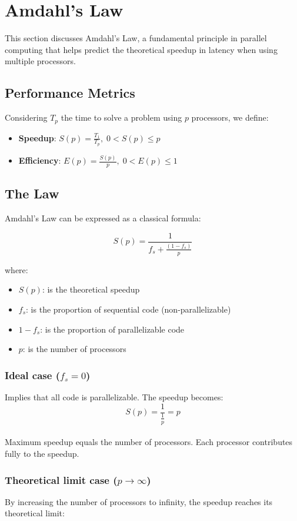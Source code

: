 \newpage
\section{Amdahl's Law}
\label{sec:amdahls_law}

This section discusses Amdahl's Law, a fundamental principle in parallel computing that helps predict the theoretical speedup in latency when using multiple processors.

\subsection{Performance Metrics}
Considering $T_p$ the time to solve a problem using $p$ processors, we define:
\begin{itemize}
    \item \textbf{Speedup}: $S(p) = \frac{T_1}{T_p},\; 0 < S(p) \le p$
    \item \textbf{Efficiency}: $E(p) = \frac{S(p)}{p},\; 0 < E(p) \le 1$
\end{itemize}

\subsection{The Law}
Amdahl's Law can be expressed as a classical formula:

\[
S(p) = \frac{1}{f_s + \frac{(1-f_s)}{p}}
\]

where:
\begin{itemize}
    \item $S(p)$: is the theoretical speedup
    \item $f_s$: is the proportion of sequential code (non-parallelizable)
    \item $1-f_s$: is the proportion of parallelizable code
    \item $p$: is the number of processors
\end{itemize}

\subsubsection*{Ideal case \texorpdfstring{ ($f_s=0$)}{ (fs=0)}}
Implies that all code is parallelizable. The speedup becomes:
\[
S(p) = \frac{1}{\frac{1}{p}} = {p}
\]
\\
Maximum speedup equals the number of processors. Each processor contributes fully to the speedup.

\subsubsection*{Theoretical limit case \texorpdfstring{ ($p \to \infty $)}{ (p->inf)}}
By increasing the number of processors to infinity, the speedup reaches its theoretical limit:

